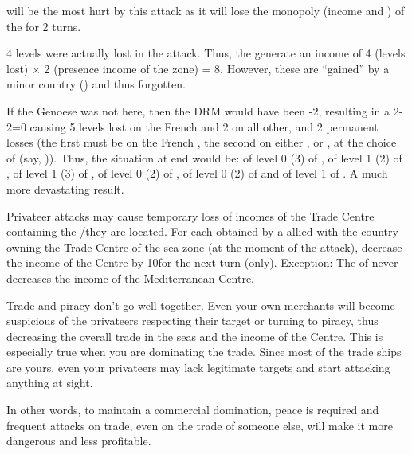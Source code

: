 \begin{exemple}
  \FRA will be the most hurt by this attack as it will lose the monopoly
  (income and \VPs) of the \STZ for 2 turns.

  4 levels were actually lost in the attack. Thus, the \corsaire generate an
  income of 4 (levels lost) $\times$ 2 (presence income of the zone) =
  8\ducats. However, these are ``gained'' by a minor country (\paysAlgerie)
  and thus forgotten.
  
  \smallskip

  If the Genoese \FLEET was not here, then the DRM would have been -2,
  resulting in a 2-2=0 causing 5 levels lost on the French \TradeFLEET and 2
  on all other, and 2 permanent losses (the first must be on the French
  \TradeFLEET, the second on either \FRA, \paysGenes or \paysHollande, at the
  choice of \TUR (say, \paysGenes)). Thus, the situation at end would be:
  \TradeFLEET\facemoins of level 0 (3) of \FRA, \TradeFLEET\facemoins of level
  1 (2) of \paysGenes, \TradeFLEET\facemoins of level 1 (3) of \paysHollande,
  \TradeFLEET\facemoins of level 0 (2) of \HIS, \TradeFLEET\facemoins of level
  0 (2) of \VEN and \TradeFLEET\facemoins of level 1 of \TUR. A much more
  devastating result.
\end{exemple}

\bparag Privateer attacks may cause temporary loss of incomes of the Trade
Centre containing the \STZ/\CTZ they are located.
\bparag For each \textetoile obtained by a \corsaire allied with the country
owning the Trade Centre of the sea zone (at the moment of the attack),
decrease the income of the Centre by 10\ducats for the next turn (only).
\bparag Exception: The \corsaire of  never decreases the
income of the Mediterranean Centre.

\begin{designnote}
  Trade and piracy don't go well together. Even your own merchants will become
  suspicious of the privateers respecting their target or turning to piracy,
  thus decreasing the overall trade in the seas and the income of the
  Centre. This is especially true when you are dominating the trade. Since
  most of the trade ships are yours, even your privateers may lack legitimate
  targets and start attacking anything at sight.

  In other words, to maintain a commercial domination, peace is required and
  frequent attacks on trade, even on the trade of someone else, will make it
  more dangerous and less profitable.
\end{designnote}

